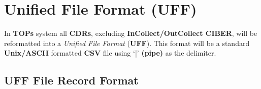 \documentclass[12pt,twoside]{article}
\begin{document}
\section{Unified File Format (UFF)}
\label{sec-7}

  In \textbf{TOPs} system all \textbf{CDRs}, excluding \textbf{InCollect/OutCollect CIBER},
  will be reformatted into a \emph{Unified File Format} (\textbf{UFF}). This
  format will be a standard \textbf{Unix/ASCII} formatted \textbf{CSV} file using
  `|' \textbf{(pipe)} as the delimiter. 
\subsection{UFF File Record Format}
\label{sec-7-1}

\footnotesize
\begin{longtable}{cll}


\end{longtable}
\end{document}
